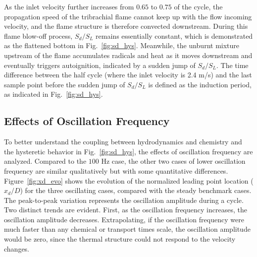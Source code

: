 As the inlet velocity further increases from $0.65$ to $0.75$ of the cycle, the propagation speed of the tribrachial flame cannot keep up with the flow incoming velocity, and the flame structure is therefore convected downstream.  During this flame blow-off process, $S_d/S_L$ remains essentially constant, which is demonstrated as the flattened bottom in Fig.~\ref{fig:sd_hys}.  Meanwhile, the unburnt mixture upstream of the flame accumulates radicals and heat as it moves downstream and eventually triggers autoignition, indicated by a sudden jump of $S_d/S_L$.  The time difference between the half cycle (where the inlet velocity is 2.4 m/s) and the last sample point before the sudden jump of $S_d/S_L$ is defined as the induction period, as indicated in Fig.~\ref{fig:sd_hys}.

\subsection{Effects of Oscillation Frequency} \label{sec:frq}

To better understand the coupling between hydrodynamics and chemistry and the hysteretic behavior in Fig.~\ref{fig:sd_hys}, the effects of oscillation frequency are analyzed.  Compared to the $100$ Hz case, the other two cases of lower oscillation frequency are similar qualitatively but with some quantitative differences.  Figure~\ref{fig:xd_evo} shows the evolution of the normalized leading point location ($x_d/D$) for the three oscillating cases, compared with the steady benchmark cases.  The peak-to-peak variation represents the oscillation amplitude during a cycle.  Two distinct trends are evident.  First, as the oscillation frequency increases, the oscillation amplitude decreases.  Extrapolating, if the oscillation frequency were much faster than any chemical or transport times scale, the oscillation amplitude would be zero, since the thermal structure could not respond to the velocity changes.

